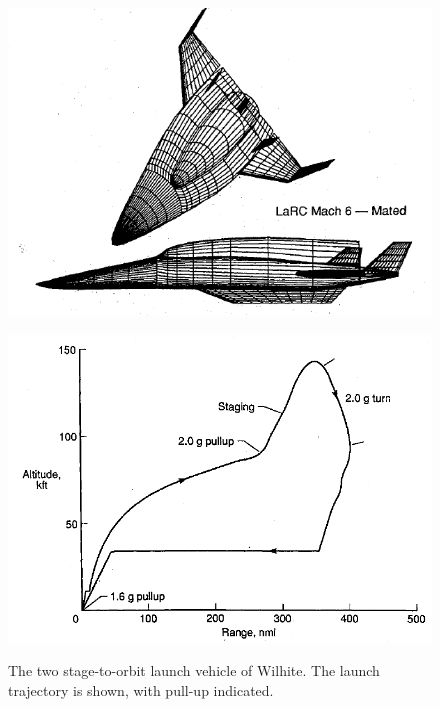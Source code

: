 \begin{figure}[!ht]
	\centering
	\begin{minipage}[b]{0.45\textwidth}
		\centering
		\includegraphics[width=\linewidth]{"figures/2_literature-review/Wilhite Booster Vehicle"}
		
		\label{fig:WilhiteVehicle}
	\end{minipage}	
	\begin{minipage}[b]{0.45\textwidth}
		\includegraphics[width=\linewidth]{"figures/2_literature-review/WilHite Booster Trajectory"}
		
		\label{fig:WilHiteTrajectory}
	\end{minipage}
	\caption{The two stage-to-orbit launch vehicle of Wilhite\cite{Wilhite1991}. The launch trajectory is shown, with pull-up indicated.}
	\label{fig:Wilhite}
\end{figure}

